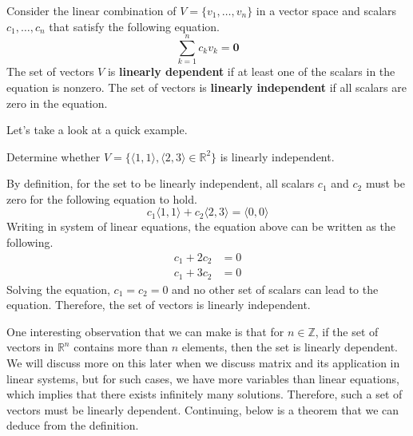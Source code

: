 \documentclass[../main.tex]{subfiles}
\begin{document}
\begin{definition}
Consider the linear combination of $V = \{ v_1, \ldots, v_n \}$
in a vector space and scalars $c_1, \ldots, c_n$ that satisfy the
following equation.
\[
\sum_{k = 1}^n c_k v_k = \mathbf{0}
\]
The set of vectors $V$ is \textbf{linearly dependent} if at least
one of the scalars in the equation is nonzero. The set of vectors is
\textbf{linearly independent} if all scalars are zero in the equation.
\end{definition}

Let's take a look at a quick example.

\begin{problem}
Determine whether $V = \{ \langle 1, 1 \rangle, \langle 2, 3\rangle
\in \mathbb{R}^2 \}$ is linearly independent.
\end{problem}
\begin{solution}
By definition, for the set to be linearly independent, all scalars
$c_1$ and $c_2$ must be zero for the following equation to hold.
\[
c_1 \langle 1, 1 \rangle + c_2 \langle 2, 3 \rangle
= \langle 0, 0 \rangle
\]
Writing in system of linear equations, the equation above can
be written as the following.
\begin{align*}
    c_1 + 2c_2 &= 0 \\
    c_1 + 3c_2 &= 0
\end{align*}
Solving the equation, $c_1 = c_2 = 0$ and no other set of scalars
can lead to the equation. Therefore, the set of vectors is linearly
independent.
\end{solution}

One interesting observation that we can make is that for $n \in
\mathbb{Z}$, if the set of vectors in $\mathbb{R}^n$ contains more
than $n$ elements, then the set is linearly dependent. We will
discuss more on this later when we discuss matrix and its application
in linear systems, but for such cases, we have more variables than
linear equations, which implies that there exists infinitely many
solutions. Therefore, such a set of vectors must be linearly
dependent. Continuing, below is a theorem that we can deduce from
the definition.
\end{document}
